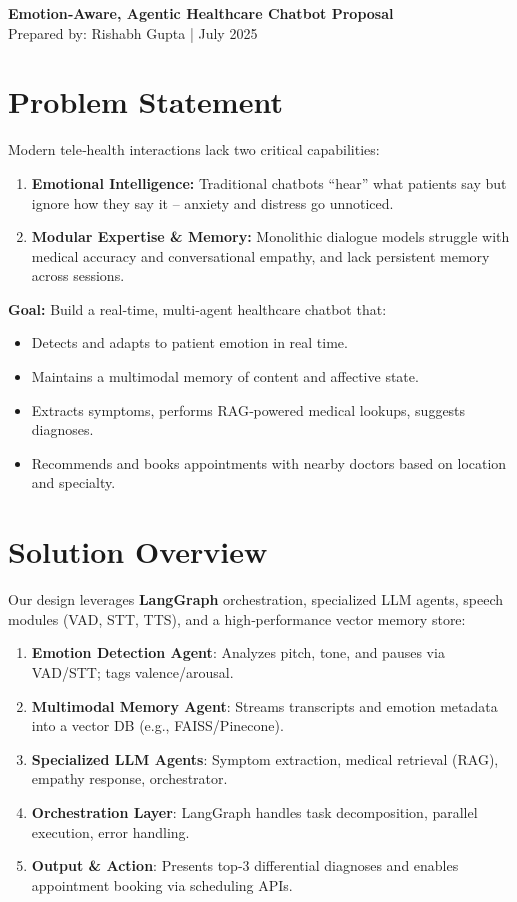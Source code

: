 \documentclass[11pt,a4paper]{article}
\begin{document}
\begin{center}
  {\LARGE \bfseries Emotion‐Aware, Agentic Healthcare Chatbot Proposal} \\
  \vspace{0.5em}
  {Prepared by: Rishabh Gupta \quad | \quad July 2025}
\end{center}

\vspace{1em}

\section{Problem Statement}
Modern tele‐health interactions lack two critical capabilities:
\begin{enumerate}[left=0pt,label=\arabic*)]
  \item \textbf{Emotional Intelligence:} Traditional chatbots “hear” what patients say but ignore how they say it – anxiety and distress go unnoticed.
  \item \textbf{Modular Expertise \& Memory:} Monolithic dialogue models struggle with medical accuracy and conversational empathy, and lack persistent memory across sessions.
\end{enumerate}

\textbf{Goal:} Build a real‐time, multi‐agent healthcare chatbot that:
\begin{itemize}[left=0pt]
  \item Detects and adapts to patient emotion in real time.
  \item Maintains a multimodal memory of content and affective state.
  \item Extracts symptoms, performs RAG‐powered medical lookups, suggests diagnoses.
  \item Recommends and books appointments with nearby doctors based on location and specialty.
\end{itemize}

\section{Solution Overview}
Our design leverages \textbf{LangGraph} orchestration, specialized LLM agents, speech modules (VAD, STT, TTS), and a high‐performance vector memory store:
\begin{enumerate}[left=0pt]
  \item \textbf{Emotion Detection Agent}: Analyzes pitch, tone, and pauses via VAD/STT; tags valence/arousal.
  \item \textbf{Multimodal Memory Agent}: Streams transcripts and emotion metadata into a vector DB (e.g., FAISS/Pinecone).
  \item \textbf{Specialized LLM Agents}: Symptom extraction, medical retrieval (RAG), empathy response, orchestrator.
  \item \textbf{Orchestration Layer}: LangGraph handles task decomposition, parallel execution, error handling.
  \item \textbf{Output \& Action}: Presents top‐3 differential diagnoses and enables appointment booking via scheduling APIs.
\end{enumerate}
\end{document}

